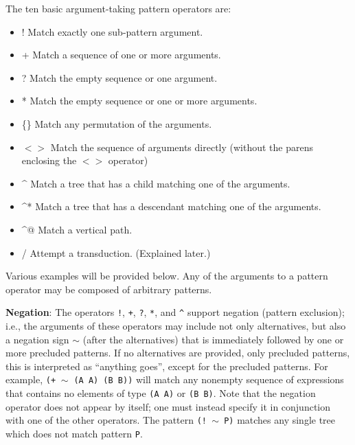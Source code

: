 \documentclass[a4,11pt]{article}
\begin{document}
The ten basic  argument-taking pattern operators are:
\begin {itemize}
\item[!]   Match exactly one sub-pattern argument.
\item[+]   Match a sequence of one or more arguments.
\item[?]   Match the empty sequence or one argument.
\item[*]   Match the empty sequence or one or more arguments.
\item[\{\}]  Match any permutation of the arguments.
\item[$<>$]  Match the sequence of arguments directly (without the parens enclosing the $<>$ operator)
\item[\textasciicircum]    Match a tree that has a child matching one of the arguments.
\item[\^{}*]    Match a tree that has a descendant matching one of the arguments.
\item[\^{}@]   Match a vertical path.
\item[/]   Attempt a transduction. (Explained later.)
\end {itemize}

\noindent Various examples will be provided below.
Any of the arguments to a pattern operator may be composed of arbitrary patterns. 

{\bf Negation}: 
The operators \texttt{!}, \texttt{+}, \texttt{?}, \texttt{*}, and \texttt{\^} support negation (pattern exclusion); i.e., the arguments of these operators may include not only alternatives, but also a negation sign \texttt{$\sim$} (after the alternatives) that is immediately followed by one or more precluded patterns. If no alternatives are provided, only precluded patterns, this is interpreted as ``anything goes'', except for the precluded patterns. For example, \texttt{(+$\;\sim\;$(A A) (B B))} will match any nonempty sequence of expressions that contains no elements of type \texttt{(A A)} or \texttt{(B B)}. Note that the negation operator does not appear by itself; one must instead specify it in conjunction with one of the other operators. The pattern \texttt{(! $\sim$ P)} matches any single tree which does not match pattern \texttt{P}.

\end{document}
